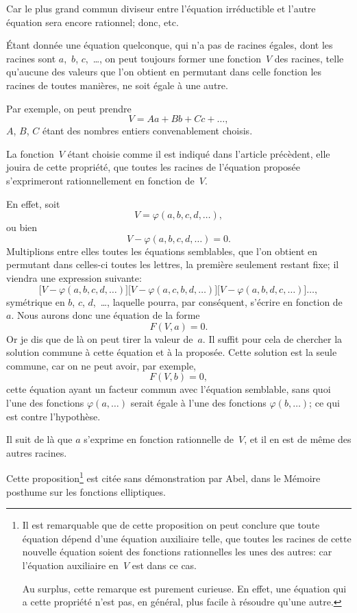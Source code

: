 \documentclass[leqno,12pt]{book}[2005/09/16]
\newenvironment{MyEnvt}[2]{%
  \medskip\par
  \ifthenelse{\equal{#1}{}}{%
    \textsc{#2.}\ --- %
  }{%
    \textsc{#2 #1}\ --- %
  }%
  \itshape\ignorespaces
}{\medskip\normalfont}
\newenvironment{Lemme}[1][]{\begin{MyEnvt}{#1}{Lemme}}{\end{MyEnvt}}
\renewcommand{\phi}{\varphi}
\begin{document}
Car le plus grand commun diviseur entre l'équation irréductible
et l'autre équation sera encore rationnel; donc, etc.

\begin{Lemme}[II.]
Étant donnée une équation quelconque, qui
n'a pas de racines égales, dont les racines sont $a$,~$b$, $c$,~\dots, on
peut toujours former une fonction~$V$ des racines, telle qu'aucune
des valeurs que l'on obtient en permutant dans celle fonction
les racines de toutes manières, ne soit égale à une autre.
\end{Lemme}

Par exemple, on peut prendre
\[
V = Aa + Bb + Cc + \dots,
\]
$A$, $B$, $C$ étant des nombres entiers convenablement choisis.

\begin{Lemme}[III.]
La fonction~$V$ étant choisie comme il est indiqué
dans l'article précèdent, elle jouira de cette propriété,
que toutes les racines de l'équation proposée s'exprimeront rationnellement
en fonction de~$V$.
\end{Lemme}

En effet, soit
\[
V = \phi (a, b, c, d, \dots),
\]
ou bien
\[
V - \phi (a, b, c, d, \dots) = 0.
\]
Multiplions entre elles toutes les équations semblables, que l'on
obtient en permutant dans celles-ci toutes les lettres, la première
seulement restant fixe; il viendra une expression suivante:
\[
\bigl[V - \phi (a, b, c, d, \dots)\bigr]
\bigl[V - \phi (a, c, b, d, \dots)\bigr]
\bigl[V - \phi (a, b, d, c, \dots)\bigr] \dots,
\]
symétrique en $b$, $c$, $d$,~\dots, laquelle pourra, par conséquent,
s'écrire en fonction de~$a$. Nous aurons donc une équation de la
forme
\[
F(V, a) = 0.
\]
Or je dis que de là on peut tirer la valeur de~$a$. Il suffit pour cela
de chercher la solution commune à cette équation et à la proposée.
Cette solution est la seule commune, car on ne peut avoir,
par exemple,
\[
F(V, b) = 0,
\]
cette équation ayant un facteur commun avec l'équation semblable,
sans quoi l'une des fonctions $\phi(a, \dots)$ serait égale à
l'une des fonctions $\phi(b, \dots)$; ce qui est contre l'hypothèse.

Il suit de là que $a$ s'exprime en fonction rationnelle de~$V$, et il
en est de même des autres racines.

Cette proposition\footnote
  {Il est remarquable que de cette proposition on peut conclure que toute
  équation dépend d'une équation auxiliaire telle, que toutes les racines de cette
  nouvelle équation soient des fonctions rationnelles les unes des autres: car
  l'équation auxiliaire en~$V$ est dans ce cas.

  Au surplus, cette remarque est purement curieuse. En effet, une équation qui
  a cette propriété n'est pas, en général, plus facile à résoudre qu'une autre.}
est citée sans démonstration par Abel,
dans le Mémoire posthume sur les fonctions elliptiques.
\end{document}
